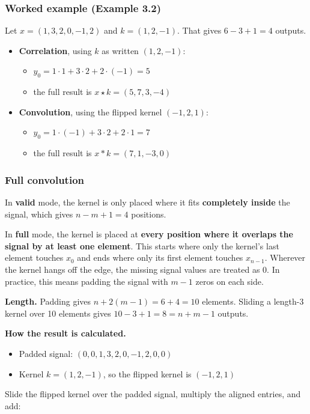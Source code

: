 \subsubsection*{Worked example (Example 3.2)}
Let $x = (1, 3, 2, 0, -1, 2)$ and $k = (1, 2, -1)$. That gives $6 - 3 + 1 = 4$ outputs.
\begin{itemize}
  \item \textbf{Correlation}, using $k$ as written $(1, 2, -1)$:
  \begin{itemize}
    \item $y_0 = 1\cdot 1 + 3\cdot 2 + 2\cdot(-1) = 5$
    \item the full result is $x \star k = (5, 7, 3, -4)$
  \end{itemize}
  \item \textbf{Convolution}, using the flipped kernel $(-1, 2, 1)$:
  \begin{itemize}
    \item $y_0 = 1\cdot(-1) + 3\cdot 2 + 2\cdot 1 = 7$
    \item the full result is $x * k = (7, 1, -3, 0)$
  \end{itemize}
\end{itemize}

\subsubsection*{Full convolution}
In \textbf{valid} mode, the kernel is only placed where it fits \textbf{completely inside} the signal, which gives $n - m + 1 = 4$ positions.

In \textbf{full} mode, the kernel is placed at \textbf{every position where it overlaps the signal by at least one element}. This starts where only the kernel's last element touches $x_0$ and ends where only its first element touches $x_{n-1}$. Wherever the kernel hangs off the edge, the missing signal values are treated as $0$. In practice, this means padding the signal with $m - 1$ zeros on each side.

\textbf{Length.} Padding gives $n + 2(m-1) = 6 + 4 = 10$ elements. Sliding a length-3 kernel over 10 elements gives $10 - 3 + 1 = 8 = n + m - 1$ outputs.

\textbf{How the result is calculated.}
\begin{itemize}
  \item Padded signal: $(0, 0, 1, 3, 2, 0, -1, 2, 0, 0)$
  \item Kernel $k = (1, 2, -1)$, so the flipped kernel is $(-1, 2, 1)$
\end{itemize}
Slide the flipped kernel over the padded signal, multiply the aligned entries, and add:

